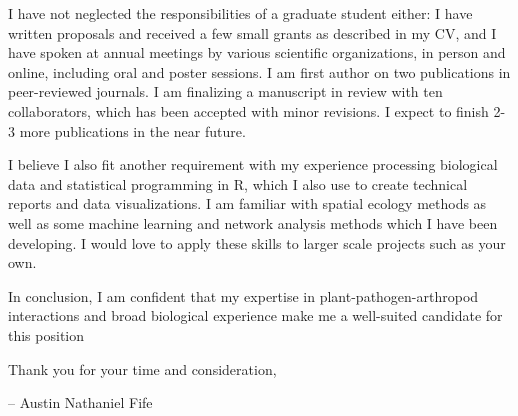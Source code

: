 \documentclass[11pt]{letter} %
\begin{document}
\begin{letter}
I have not neglected the responsibilities of a graduate student either: I have written proposals and received a few small grants as described in my CV, and I  have spoken at annual meetings by various scientific organizations, in person and online, including oral and poster sessions. I am first author on two publications in peer-reviewed journals. I am finalizing a manuscript in review with ten collaborators, which has been accepted with minor revisions. I expect to finish 2-3 more publications in the near future.

I believe I also fit another requirement with my experience processing biological data and statistical programming in R, which I also use to create technical reports and data visualizations. I am familiar with spatial ecology methods as well as some machine learning and network analysis methods which I have been developing. I would love to apply these skills to larger scale projects such as your own.

In conclusion, I am confident that my expertise in plant-pathogen-arthropod interactions and broad biological experience make me a well-suited candidate for this position

Thank you for your time and consideration,

\quad -- Austin Nathaniel Fife

\thispagestyle{empty}

\end{letter}
\end{document}
